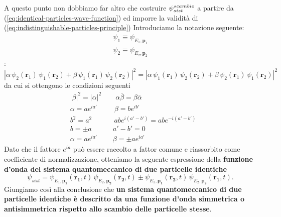 A questo punto non dobbiamo far altro che costruire $ \mathlarger{\psi}^{scambio}_{sist}$
a partire da (\ref{eq:identical-particles-wave-function}) ed imporre la validità di (\ref{eq:indistinguishable-particles-principle})\sidenote
{
Introduciamo la notazione seguente:
\begin{gather*}
    \psi_1 \equiv \psi_{E_1,\bm{p}_1} \\
    \psi_2 \equiv \psi_{E_2,\bm{p}_2}
\end{gather*}
}:
\[
    |\alpha\, \psi_2(\bm{r}_1)\,\psi_1(\bm{r}_2) + \beta\, \psi_1(\bm{r}_1)\,\psi_2(\bm{r}_2)|^2 =
    |\alpha\, \psi_1(\bm{r}_1)\,\psi_2(\bm{r}_2) + \beta\, \psi_2(\bm{r}_1)\,\psi_1(\bm{r}_2)|^2
\]
da cui si ottengono le condizioni seguenti
\begin{align*}
    &|\beta|^{2} = |\alpha|^{2} \qquad \alpha \bar{\beta} = \beta \bar{\alpha}  \\
    &\alpha = ae^{ ia' } \quad \ \  \quad  \beta = b e^{ ib' }  \\
    &b^{2} = a^{2} \qquad \quad \, ab e^{ i(a'-b') } = abe^{ -i(a'-b') } \\
    &b = \pm a \qquad \quad a'-b'=0 \\
    &\alpha = a e^{ ia' } \qquad \ \beta = \pm ae^{ ia' }
\end{align*}
Dato che il fattore $ e^{ia}$ può essere raccolto a fattor comune e riassorbito come
coefficiente di normalizzazione, otteniamo la seguente espressione della \textbf{funzione d’onda del sistema quantomeccanico
di due particelle identiche}
\begin{equation}
    \psi_{sist} = \psi_{E_1, \bm{p_1}} (\bm{r_1}, t) \, \psi_{E_2, \bm{p_2}} (\bm{r_2}, t) \pm \psi_{E_1, \bm{p_1}} (\bm{r_2}, t) \, \psi_{E_2, \bm{p_2}} (\bm{r_1}, t).
    \label{eq:identical-particles-wave-function}
\end{equation}
Giungiamo così alla conclusione che \textbf{un sistema quantomeccanico di due particelle identiche è descritto da una funzione
d’onda simmetrica o antisimmetrica rispetto allo scambio delle particelle stesse}.

